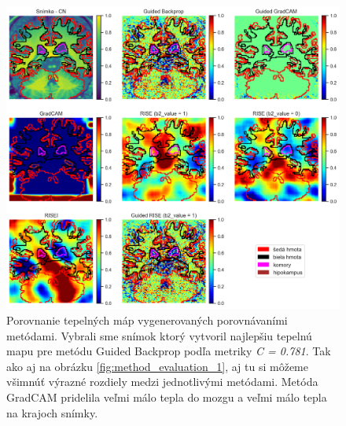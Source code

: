 \begin{figure}[h!]
    \centering
    \includegraphics[width=13cm]{assets/images/method_evaluation_2.png}
    \caption{Porovnanie tepelných máp vygenerovaných porovnávaními metódami. Vybrali sme snímok ktorý vytvoril najlepšiu tepelnú mapu pre metódu Guided Backprop podľa metriky \textit{C = 0.781}. Tak ako aj na obrázku \ref{fig:method_evaluation_1}, aj tu si môžeme všimnúť výrazné rozdiely medzi jednotlivými metódami. Metóda GradCAM pridelila veľmi málo tepla do mozgu a veľmi málo tepla na krajoch snímky.}
    \label{fig:method_evaluation_2}   
\end{figure}

